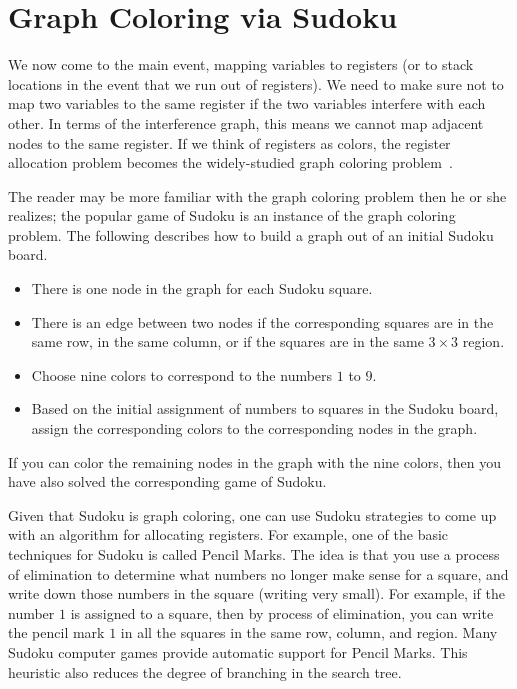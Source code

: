 \documentclass[11pt]{book}
\begin{document}
\section{Graph Coloring via Sudoku}

We now come to the main event, mapping variables to registers (or to
stack locations in the event that we run out of registers).  We need
to make sure not to map two variables to the same register if the two
variables interfere with each other.  In terms of the interference
graph, this means we cannot map adjacent nodes to the same register.
If we think of registers as colors, the register allocation problem
becomes the widely-studied graph coloring
problem~\citep{Balakrishnan:1996ve,Rosen:2002bh}.  

The reader may be more familiar with the graph coloring problem then he
or she realizes; the popular game of Sudoku is an instance of the
graph coloring problem. The following describes how to build a graph
out of an initial Sudoku board.
\begin{itemize}
\item There is one node in the graph for each Sudoku square.
\item There is an edge between two nodes if the corresponding squares
  are in the same row, in the same column, or if the squares are in
  the same $3\times 3$ region.
\item Choose nine colors to correspond to the numbers $1$ to $9$.
\item Based on the initial assignment of numbers to squares in the
  Sudoku board, assign the corresponding colors to the corresponding
  nodes in the graph.
\end{itemize}
If you can color the remaining nodes in the graph with the nine
colors, then you have also solved the corresponding game of Sudoku.

Given that Sudoku is graph coloring, one can use Sudoku strategies to
come up with an algorithm for allocating registers. For example, one
of the basic techniques for Sudoku is called Pencil Marks. The idea is
that you use a process of elimination to determine what numbers no
longer make sense for a square, and write down those numbers in the
square (writing very small). For example, if the number $1$ is
assigned to a square, then by process of elimination, you can write
the pencil mark $1$ in all the squares in the same row, column, and
region. Many Sudoku computer games provide automatic support for
Pencil Marks. This heuristic also reduces the degree of branching in
the search tree.
\end{document}
